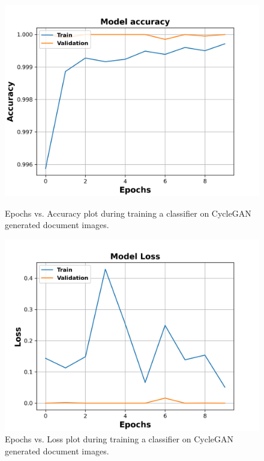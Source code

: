 \begin{figure}[H]
  \centering
  \begin{minipage}[b]{0.45\textwidth}
    \includegraphics[width=\textwidth]{images/Evaluation/CycleGAN_Generated_Data_Classifier_2021-06-02_21-55-39_Accuracy.png}
    \caption[Epochs vs. Accuracy plot during training a classifier on \ac{CycleGAN} generated document images.]{Epochs vs. Accuracy plot during training a classifier  on \ac{CycleGAN} generated document images.}
    \label{fig:CycleGANClassifierAcc}
  \end{minipage}
  \hfill
  \begin{minipage}[b]{0.45\textwidth}
    \includegraphics[width=\textwidth]{images/Evaluation/CycleGAN_Generated_Data_Classifier_2021-06-02_21-55-39_Loss.png}
    \caption[Epochs vs. Loss plot during training a classifier on \ac{CycleGAN} generated document images.]{Epochs vs. Loss plot during training a classifier on \ac{CycleGAN} generated document images.}
    \label{fig:CycleGANClassifierLoss}
  \end{minipage}
\end{figure}


